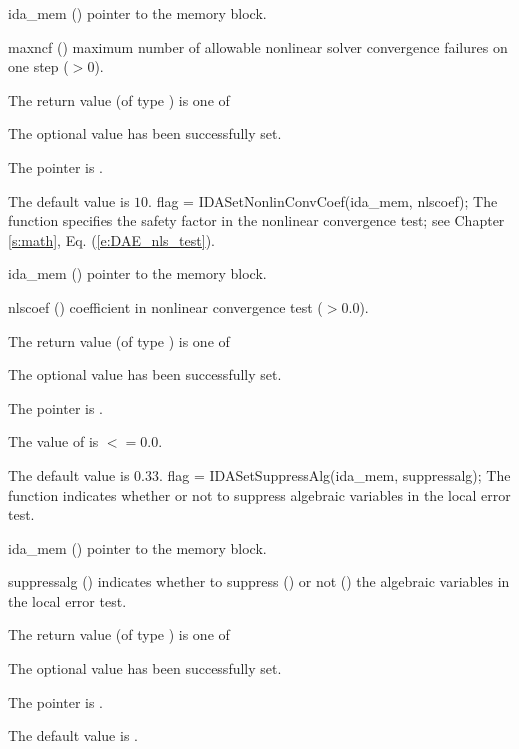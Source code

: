 {{\begin{args}
  \item[ida\_mem] ()
    pointer to the {\idas} memory block.
  \item[maxncf] ()
    maximum number of allowable nonlinear solver convergence failures
    on one step ($>0$).
  \end{args}
}
{
  The return value  (of type ) is one of
  \begin{args}
  \item[\Id{IDA\_SUCCESS}]
    The optional value has been successfully set.
  \item[\Id{IDA\_MEM\_NULL}]
    The  pointer is .
  \end{args}
}
{
  The default value is $10$.
}
{
flag = IDASetNonlinConvCoef(ida\_mem, nlscoef);
}
{
  The function  specifies the safety factor
  in the nonlinear convergence test;
  see Chapter \ref{s:math}, Eq. (\ref{e:DAE_nls_test}).
}
{
  \begin{args}
  \item[ida\_mem] ()
    pointer to the {\idas} memory block.
  \item[nlscoef] ()
    coefficient in nonlinear convergence test ($>0.0$).
  \end{args}
}
{
  The return value  (of type ) is one of
  \begin{args}
  \item[\Id{IDA\_SUCCESS}]
    The optional value has been successfully set.
  \item[\Id{IDA\_MEM\_NULL}]
    The  pointer is .
  \item[\Id{IDA\_ILL\_INPUT}]
    The value of  is $<= 0.0$.
  \end{args}
}
{
  The default value is $0.33$.
}
{
flag = IDASetSuppressAlg(ida\_mem, suppressalg);
}
{
  The function  indicates whether or not to
  suppress algebraic variables in the local error test.
}
{
  \begin{args}[suppressalg]
  \item[ida\_mem] ()
    pointer to the {\idas} memory block.
  \item[suppressalg] ()
    indicates whether to suppress () or not
    () the algebraic variables in the local error test.
  \end{args}
}
{
  The return value  (of type ) is one of
  \begin{args}
  \item[\Id{IDA\_SUCCESS}]
    The optional value has been successfully set.
  \item[\Id{IDA\_MEM\_NULL}]
    The  pointer is .
  \end{args}
}
{
  The default value is .

}}

